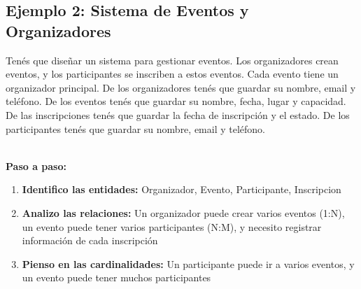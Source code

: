 \documentclass[12pt]{article}
\begin{document}
\subsection{Ejemplo 2: Sistema de Eventos y Organizadores}
Tenés que diseñar un sistema para gestionar eventos. Los organizadores crean eventos, y los participantes se inscriben a estos eventos. Cada evento tiene un organizador principal. De los organizadores tenés que guardar su nombre, email y teléfono. De los eventos tenés que guardar su nombre, fecha, lugar y capacidad. De las inscripciones tenés que guardar la fecha de inscripción y el estado. De los participantes tenés que guardar su nombre, email y teléfono.

\textbf{\\Paso a paso:}
\begin{enumerate}
    \item \textbf{Identifico las entidades:} Organizador, Evento, Participante, Inscripcion
    \item \textbf{Analizo las relaciones:} Un organizador puede crear varios eventos (1:N), un evento puede tener varios participantes (N:M), y necesito registrar información de cada inscripción
    \item \textbf{Pienso en las cardinalidades:} Un participante puede ir a varios eventos, y un evento puede tener muchos participantes
\end{enumerate}
\end{document}
